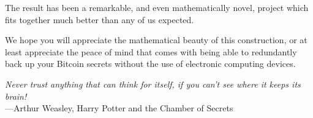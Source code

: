 \documentclass[letterpaper]{article}
\begin{document}
The result has been a remarkable, and even mathematically novel, project which
fits together much better than any of us expected.

We hope you will appreciate the mathematical beauty of this construction, or
at least appreciate the peace of mind that comes with being able to redundantly
back up your Bitcoin secrets without the use of electronic computing devices.

\vfill
\begin{center}
\emph{Never trust anything that can think for itself, if you can’t see where it
keeps its brain!}\\
\hfill---Arthur Weasley, Harry Potter and the Chamber of Secrets
\end{center}
\end{document}

